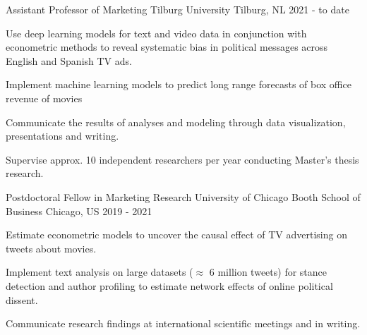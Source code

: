 \begin{section}[Experience]

  \entry%
  {Assistant Professor of Marketing} %
  {Tilburg University} %
  {Tilburg, NL} %
  {2021 - to date} %
  {%
    \begin{entrylist}
      \item Use deep learning models for text and video data in conjunction with econometric methods to reveal systematic bias in political messages across English and Spanish TV ads. 
      \item Implement machine learning models to predict long range forecasts of box office revenue of movies 
      \item Communicate the results of analyses and modeling through data visualization, presentations and writing.
      \item Supervise approx. 10 independent researchers per year conducting Master's thesis research.
    \end{entrylist}
  }%


  \entry%
  {Postdoctoral Fellow in Marketing Research} %
  {University of Chicago Booth School of Business} %
  {Chicago, US} %
  {2019 - 2021} %
  {%
    \begin{entrylist}
      \item Estimate econometric models to uncover the causal effect of TV advertising on tweets about movies.
      \item Implement text analysis on large datasets ($\approx$ 6 million tweets) for stance detection and author profiling to estimate network effects of online political dissent.
      \item Communicate research findings at international scientific meetings and in writing.
    \end{entrylist}
  }%
  

\end{section}
